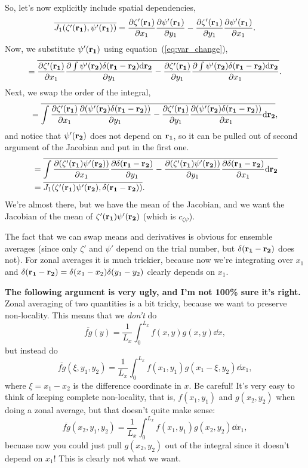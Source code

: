 \documentclass{paper}
\newcommand*{\mean}[1]{\overline{#1}}
\newcommand{\czp}{c_{\zeta\psi}}
\newcommand{\rr}[1]{\vb{r_{#1}}}
\newcommand{\Jac}[3][]{\pdv{#2}{x_{#1}}\pdv{#3}{y_{#1}} - \pdv{#2}{y_{#1}}\pdv{#3}{x_{#1}}}
\begin{document}
So, let's now explicitly include spatial dependencies,
\begin{equation}
  \label{eq:expanded_J1}
  \mean{J_1(\zeta'(\rr1), \psi'(\rr1))} = \Jac[1]{\zeta'(\rr1)}{\psi'(\rr1)}.
\end{equation}
Now, we substitute $\psi'(\rr1)$ using equation~(\ref{eq:var_change}),
\begin{equation}
  \label{eq:expanded_J1_int}
  = \mean{\Jac[1]{\zeta'(\rr1)}{\int \psi'(\rr2) \delta(\rr1 - \rr2) \dd \rr2}}.
\end{equation}
Next, we swap the order of the integral,
\begin{equation}
  \label{eq:expanded_J1_int_swap}
  = \mean{\int{\Jac[1]{\zeta'(\rr1)}{(\psi'(\rr2) \delta(\rr1 - \rr2)) }\dd \rr2}},
\end{equation}
and notice that $\psi'(\rr2)$ does not depend on $\rr1$, so it can be pulled out of second argument of the Jacobian and put in the first one.
\begin{equation}
  \label{eq:expanded_J1_int_combined}
  \begin{split}
  & = \mean{\int{\Jac[1]{(\zeta'(\rr1)\psi'(\rr2))}{\delta(\rr1 - \rr2) }\dd \rr2}}\\
  & = \mean{J_1(\zeta'(\rr1)\psi'(\rr2),\delta(\rr1 - \rr2))}.
\end{split}
\end{equation}
We're almost there, but we have the mean of the Jacobian, and we want the Jacobian of the mean of $\zeta'(\rr1)\psi'(\rr2)$ (which is $\czp$).


The fact that we can swap means and derivatives is obvious for ensemble averages (since only $\zeta'$ and $\psi'$ depend on the trial number, but $\delta(\rr1 - \rr2)$ does not). For zonal averages it is much trickier, because now we're integrating over $x_1$ and $\delta(\rr1-\rr2) = \delta(x_1 - x_2) \delta(y_1 - y_2)$ clearly depends on $x_1$.

\textbf{The following argument is very ugly, and I'm not 100\% sure it's right.}
Zonal averaging of two quantities is a bit tricky, because we want to preserve non-locality. This means that we \emph{don't} do
\begin{equation}
  \label{eq:zonal-wrong}
  \mean{fg}(y) = \frac{1}{L_x} \int_0^{L_x} f(x, y) g(x, y) \dd{x},
\end{equation}
but instead do
\begin{equation}
  \label{eq:zonal-right}
  \mean{fg}(\xi, y_1, y_2) = \frac{1}{L_x} \int_0^{L_x} f(x_1, y_1) g(x_1 - \xi, y_2) \dd{x_1},
\end{equation}
where $\xi = x_1 - x_2$ is the difference coordinate in $x$. Be careful! It's very easy to think of keeping complete non-locality, that is, $f(x_1, y_1)$ and $g(x_2, y_2)$ when doing a zonal average, but that doesn't quite make sense:
\begin{equation}
  \label{eq:zonal-not-right}
  \mean{fg}(x_2, y_1, y_2) = \frac{1}{L_x} \int_0^{L_x} f(x_1, y_1) g(x_2, y_2) \dd{x_1},
\end{equation}
becuase now you could just pull $g(x_2, y_2)$ out of the integral since it doesn't depend on $x_1$! This is clearly not what we want.
\end{document}
